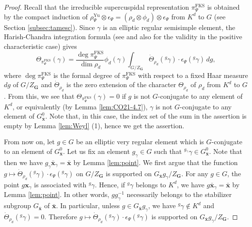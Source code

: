 \documentclass{amsart}
\newcommand{\FKS}{\mathrm{FKS}}
\newcommand{\Yu}{\mathrm{Yu}}
\newcommand{\x}{\mathbf{x}}
\newcommand{\bfG}{\mathbf{G}}
\theoremstyle{plain}
\theoremstyle{definition}
\theoremstyle{remark}
\theoremstyle{theorem}
\begin{document}
\begin{proof}


Recall that the irreducible supercuspidal representation $\pi^{\FKS}_{\Psi}$ is obtained by the compact induction of $\rho_{\Psi}^{\Yu}\otimes\epsilon_{\Psi}=(\rho_{d}\otimes\phi_{d})\otimes\epsilon_{\Psi}$ from $K^{d}$ to $G$ (see Section \ref{subsec:tamesc}).
Since $\gamma$ is an elliptic regular semisimple element, the Harish-Chandra integration formula (see \cite[page 94]{HC70} and also \cite[proof of Theorem 6.4]{AS09} for the validity in the positive characteristic case) gives 
\[
\Theta_{\pi^{\FKS}_{\Psi}}(\gamma)
= 
\frac{\deg\pi^{\FKS}_{\Psi}}{\dim\rho_{d}} \phi_d(\gamma)
\int_{G/Z_\bfG}\dot{\Theta}_{\rho_{d}}({}^{g} \gamma)\cdot\epsilon_{\Psi}({}^{g}\gamma) \, dg,
\]
where $\deg\pi^{\FKS}_{\Psi}$ is the formal degree of $\pi^{\FKS}_{\Psi}$ with respect to a fixed Haar measure $dg$ of $G/Z_{\bfG}$ and $\dot{\Theta}_{\rho_{d}}$ is the zero extension of the character $\Theta_{\rho_{d}}$ of $\rho_{d}$ from $K^{d}$ to $G$.
From this, we see that $\Theta_{\pi^{\FKS}_{\Psi}}(\gamma)=0$ if $g$ is not $G$-conjugate to any element of $K^{d}$, or equivalently (by Lemma \ref{lem:CO21-4.7}), $\gamma$ is not $G$-conjugate to any element of $G^{0}_{\bar{\x}}$.
Note that, in this case, the index set of the sum in the assertion is empty by Lemma \ref{lem:Weyl} (1), hence we get the assertion.

From now on, let $g\in G$ be an elliptic very regular element which is $G$-conjugate to an element of $G^{0}_{\bar{\x}}$.
Let us fix an element $g_{\gamma}\in G$ such that ${}^{g_{\gamma}}\gamma\in G^{0}_{\bar{\x}}$.
Note that then we have $g_{\gamma}\bar{\x}_{\gamma}=\bar{\x}$ by Lemma \ref{lem:point}.
We first argue that the function $g \mapsto \dot{\Theta}_{\rho_{d}}({}^g \gamma)\cdot\epsilon_{\Psi}({}^{g}\gamma)$ on $G/Z_\bfG$ is supported on $G_{\bar{\x}}g_{\gamma}/Z_\bfG$.
For any $g\in G$, the point $g\x_{\gamma}$ is associated with ${}^{g}\gamma$.
Hence, if ${}^{g}\gamma$ belongs to $K^{d}$, we have $g\bar{\x}_{\gamma}=\bar{\x}$ by Lemma \ref{lem:point}.
In other words, $gg_{\gamma}^{-1}$ necessarily belongs to the stabilizer subgroup $G_{\bar{\x}}$ of $\bar{\x}$.
In particular, unless $g\in G_{\bar{\x}}g_{\gamma}$,  we have ${}^g \gamma \notin K^{d}$ and $\dot{\Theta}_{\rho_{d}}({}^g \gamma) = 0$.
Therefore $g \mapsto \dot{\Theta}_{\rho_{d}}({}^g \gamma)\cdot\epsilon_{\Psi}({}^{g}\gamma)$ is supported on $G_{\bar{\x}}g_{\gamma}/Z_\bfG$.


\end{proof}
\end{document}
